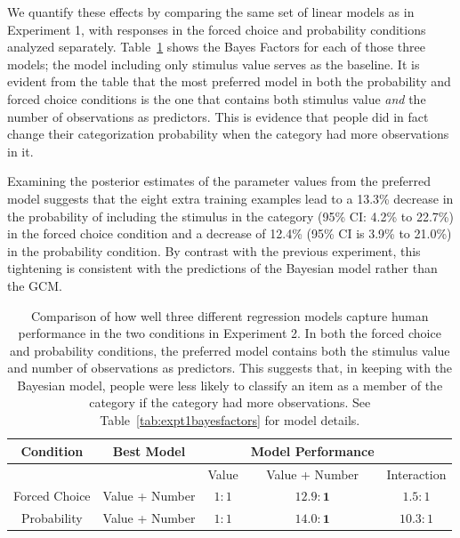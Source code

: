 \documentclass[doc,apacite]{apa6}
\begin{document}
We quantify these effects by comparing the same set of linear models as in Experiment 1, with responses in the {\sc forced choice} and {\sc probability} conditions analyzed separately.
Table~\ref{tab:expt2bayesfactors} shows the Bayes Factors for each of those three models; the model including only stimulus value serves as the baseline. It is evident from the table that the most preferred model in both the {\sc probability} and {\sc forced choice} conditions is the one that contains both stimulus value {\it and} the number of observations as predictors. This is evidence that people did in fact change their categorization probability when the category had more observations in it.

Examining the posterior estimates of the parameter values from the preferred model suggests that the eight extra training examples lead to a 13.3\% decrease in the probability of including the stimulus in the category
(95\% CI: 4.2\% to 22.7\%) in the {\sc forced choice} condition and a decrease of 12.4\% (95\% CI is 3.9\% to 21.0\%) in the {\sc probability} condition. By contrast with the previous experiment, this tightening is consistent with the predictions of the Bayesian model rather than the GCM.


\begin{table}[t]
  \centering
  \begin{tabular}{ccccc} %
    \toprule
    Condition & Best Model & & Model Performance & \\
    \midrule
    & & Value & Value + Number & Interaction \\
    \midrule
    Forced Choice & Value + Number & $ 1 : 1 $ & $ \mathbf{12.9 : 1} $ & $ 1.5 : 1 $ \\
    Probability & Value + Number & $ 1 : 1 $ & $ \mathbf{14.0 : 1} $ & $ 10.3 : 1 $ \\
    \bottomrule
  \end{tabular}
  \caption{Comparison of how well three different regression models capture human performance in the two  conditions in Experiment 2. In both the {\sc forced choice} and {\sc probability} conditions, the preferred model contains both the stimulus value and number of observations as predictors. This suggests that, in keeping with the Bayesian model, people were less likely to classify an item as a member of the category if the category had more observations. See Table~\ref{tab:expt1bayesfactors} for model details.}
  \label{tab:expt2bayesfactors}
\end{table}
\end{document}
